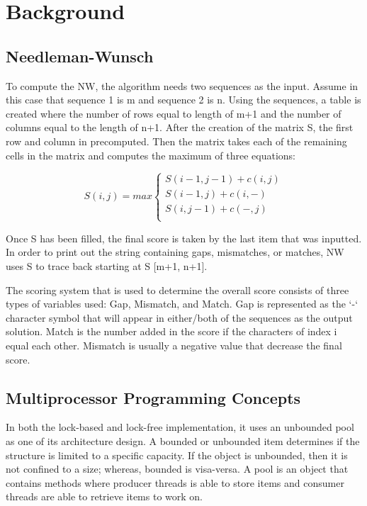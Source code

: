 \documentclass[letterpaper, 10 pt, conference]{IEEEconf}
\begin{document}
\section{Background}

\subsection{Needleman-Wunsch}

To compute the NW, the algorithm needs two sequences as the input. Assume in this case that sequence 1 is m and sequence 2 is n. Using the sequences, a table is created where the number of rows equal to length of m+1 and the number of columns equal to the length of n+1. After the creation of the matrix S, the first row and column in precomputed. Then the matrix takes each of the remaining cells in the matrix and computes the maximum of three equations: 


\begin{equation}
	S(i, j) = max 
	\begin{cases}
		S(i-1, j-1) + c(i, j)\\
		S(i-1, j) + c(i, -)\\
		S(i, j-1) + c(-, j)\\
	\end{cases}
\end{equation}

Once S has been filled, the final score is taken by the last item that was inputted. In order to print out the string containing gaps, mismatches, or matches, NW uses S to trace back starting at S [m+1, n+1].

The scoring system that is used to determine the overall score consists of three types of variables used: Gap, Mismatch, and Match. Gap is represented as the ‘-‘ character symbol that will appear in either/both of the sequences as the output solution. Match is the number added in the score if the characters of index i equal each other. Mismatch is usually a negative value that decrease the final score. 

\subsection{Multiprocessor Programming Concepts}
In both the lock-based and lock-free implementation, it uses an unbounded pool as one of its architecture design. A bounded or unbounded item determines if the structure is limited to a specific capacity. If the object is unbounded, then it is not confined to a size; whereas, bounded is visa-versa. A pool is an object that contains methods where producer threads is able to store items and consumer threads are able to retrieve items to work on. 
\end{document}
